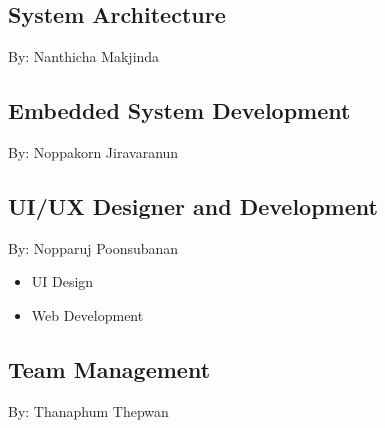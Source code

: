 \documentclass[fontsize=14pt]{extarticle}
\begin{document}
\subsection{System Architecture}
By: Nanthicha Makjinda

\pagebreak
\subsection{Embedded System Development}
By: Noppakorn Jiravaranun
\pagebreak
\subsection{UI/UX Designer and Development}
By: Nopparuj Poonsubanan
\begin{itemize}
    \item{UI Design}
    \item{Web Development}
\end{itemize}

\pagebreak
\subsection{Team Management}
By: Thanaphum Thepwan
\pagebreak
\end{document}
